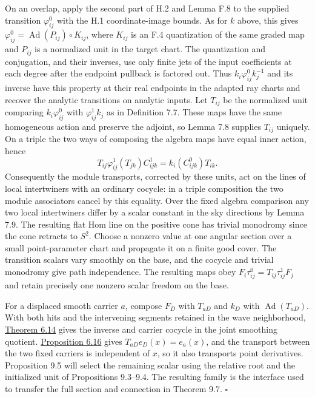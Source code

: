 \documentclass[
  english,
  11pt,
  reqno]{amsart}
\begin{document}
On an overlap, apply the second part of H.2 and Lemma F.8 to the
supplied transition \(\varphi^0_{ij}\) with the H.1 coordinate-image
bounds. As for \(k\) above, this gives
\(\varphi^0_{ij}=\operatorname{Ad}(P_{ij})\circ K_{ij}\), where
\(K_{ij}\) is an F.4 quantization of the same graded map and \(P_{ij}\)
is a normalized unit in the target chart. The quantization and
conjugation, and their inverses, use only finite jets of the input
coefficients at each degree after the endpoint pullback is factored out.
Thus \(k_i\varphi^0_{ij}k_j^{-1}\) and its inverse have this property at
their real endpoints in the adapted ray charts and recover the analytic
transitions on analytic inputs. Let \(T_{ij}\) be the normalized unit
comparing \(k_i\varphi^0_{ij}\) with \(\varphi^1_{ij}k_j\) as in
Definition 7.7. These maps have the same homogeneous action and preserve
the adjoint, so Lemma 7.8 supplies \(T_{ij}\) uniquely. On a triple the
two ways of composing the algebra maps have equal inner action, hence \[
T_{ij}\varphi^1_{ij}(T_{jk})C^1_{ijk}
   =k_i(C^0_{ijk})T_{ik}.
\] Consequently the module transports, corrected by these units, act on
the lines of local intertwiners with an ordinary cocycle: in a triple
composition the two module associators cancel by this equality. Over the
fixed algebra comparison any two local intertwiners differ by a scalar
constant in the sky directions by Lemma 7.9. The resulting flat Hom line
on the positive cone has trivial monodromy since the cone retracts to
\(S^2\). Choose a nonzero value at one angular section over a small
point-parameter chart and propagate it on a finite good cover. The
transition scalars vary smoothly on the base, and the cocycle and
trivial monodromy give path independence. The resulting maps obey
\(F_i\tau^0_{ij}=T_{ij}\tau^1_{ij}F_j\) and retain precisely one nonzero
scalar freedom on the base.

For a displaced smooth carrier \(a\), compose \(F_D\) with \(T_{aD}\)
and \(k_D\) with \(\operatorname{Ad}(T_{aD})\). With both hits and the
intervening segments retained in the wave neighborhood,
\hyperref[thm:online-wave-carrier-cocycle]{Theorem 6.14} gives the
inverse and carrier cocycle in the joint smoothing quotient.
\hyperref[prop:online-wave-full-evaluation-comparison]{Proposition 6.16}
gives \(T_{aD}e_D(x)=e_a(x)\), and the transport between the two fixed
carriers is independent of \(x\), so it also transports point
derivatives. Proposition 9.5 will select the remaining scalar using the
relative root and the initialized unit of Propositions 9.3--9.4. The
resulting family is the interface used to transfer the full section and
connection in Theorem 9.7. \hfill\(\square\)
\end{document}
